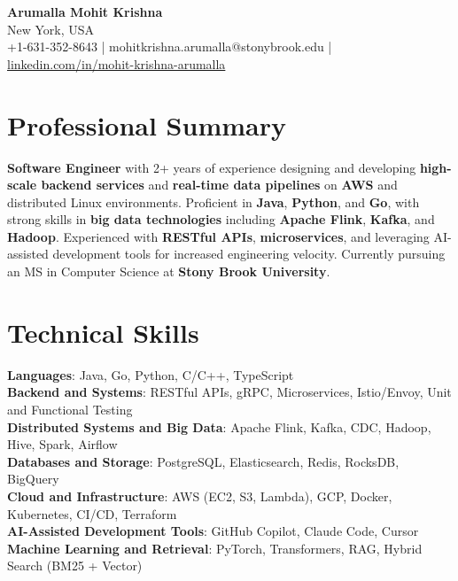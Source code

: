 \documentclass[letterpaper,11pt]{article}
\begin{document}
\begin{center}
  {\Large \textbf{Arumalla Mohit Krishna}} \\
  New York, USA \\
  +1-631-352-8643 \enspace | \enspace mohitkrishna.arumalla@stonybrook.edu \enspace | \enspace \href{https://www.linkedin.com/in/mohit-krishna-arumalla}{linkedin.com/in/mohit-krishna-arumalla}
\end{center}

\section{Professional Summary}
  \begin{itemize}[leftmargin=0.15in, label={}]
    \small{\item{
     \textbf{Software Engineer} with 2+ years of experience designing and developing \textbf{high-scale backend services} and \textbf{real-time data pipelines} on \textbf{AWS} and distributed Linux environments. Proficient in \textbf{Java}, \textbf{Python}, and \textbf{Go}, with strong skills in \textbf{big data technologies} including \textbf{Apache Flink}, \textbf{Kafka}, and \textbf{Hadoop}. Experienced with \textbf{RESTful APIs}, \textbf{microservices}, and leveraging AI-assisted development tools for increased engineering velocity. Currently pursuing an MS in Computer Science at \textbf{Stony Brook University}.
    }}
  \end{itemize}
\vspace{-16pt}

\section{Technical Skills}
 \begin{itemize}[leftmargin=0.15in, label={}]
    \small{\item{
     \textbf{Languages}: Java, Go, Python, C/C++, TypeScript \\
     \textbf{Backend and Systems}: RESTful APIs, gRPC, Microservices, Istio/Envoy, Unit and Functional Testing \\
     \textbf{Distributed Systems and Big Data}: Apache Flink, Kafka, CDC, Hadoop, Hive, Spark, Airflow \\
     \textbf{Databases and Storage}: PostgreSQL, Elasticsearch, Redis, RocksDB, BigQuery \\
     \textbf{Cloud and Infrastructure}: AWS (EC2, S3, Lambda), GCP, Docker, Kubernetes, CI/CD, Terraform \\
     \textbf{AI-Assisted Development Tools}: GitHub Copilot, Claude Code, Cursor \\
     \textbf{Machine Learning and Retrieval}: PyTorch, Transformers, RAG, Hybrid Search (BM25 + Vector)
    }}
 \end{itemize}
\vspace{-16pt}
\end{document}
